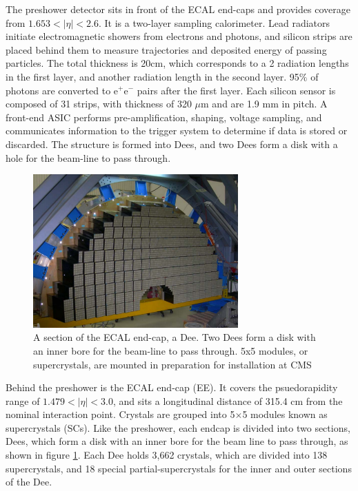 \par The preshower detector sits in front of the ECAL end-caps and
provides coverage from $1.653<|\eta|<2.6$.  It is a two-layer sampling
calorimeter.  Lead radiators initiate electromagnetic showers from
electrons and photons, and silicon strips are placed behind them to
measure trajectories and deposited energy of passing particles.  The
total thickness is 20cm, which corresponds to a 2 radiation lengths in
the first layer, and another radiation length in the second layer.
95$\%$ of photons  are converted to e$^{+}$e$^{-}$ pairs after the
first layer.  Each silicon sensor is composed of 31 strips, with
thickness of 320 $\mu$m and are 1.9 mm in pitch.  A front-end ASIC
performs pre-amplification, shaping, voltage sampling, and
communicates information to the trigger system to determine if data is
stored or discarded.  The structure is formed into Dees, and two Dees
form a disk with a hole for the beam-line to pass through.    

\begin{figure}[h]
   \centering
  \includegraphics[width=0.7\textwidth]{Figures/CMS_Diagrams/ECAL__EndCap_Dee.pdf}
  \caption{A section of the ECAL end-cap, a Dee.  Two Dees form a disk
  with an inner bore for the beam-line to pass through.  5x5 modules,
  or supercrystals, are mounted in preparation for installation at CMS} \label{fig:ecal_endcap_dee}
\end{figure}

\par Behind the preshower is the ECAL end-cap (EE).  It covers the
psuedorapidity range of $1.479<|\eta|<3.0$, and sits a longitudinal
distance of 315.4 cm from the nominal interaction point.  Crystals are
grouped into 5$\times$5 modules known as supercrystals (SCs).  Like
the preshower, each endcap is divided into two sections, Dees, which
form a disk with an inner bore for the beam line to pass through, as
shown in figure \ref{fig:ecal_endcap_dee}.  Each Dee holds 3,662
crystals, which are divided into 138 supercrystals, and 18 special
partial-supercrystals for the inner and outer sections of the Dee.  

